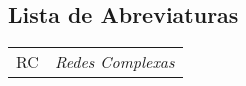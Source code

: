 \begin{center}
\chapter*{Lista de Abreviaturas}
\end{center}

\singlespacing

\noindent
 
\begin{tabular}{p{2.5cm} p{12cm}}
RC & \textit{Redes Complexas}\\
\end{tabular}


\clearpage
